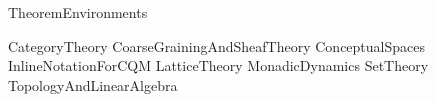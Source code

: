 


	{TheoremEnvironments} %
		
	\newcommand{\emptyArg}{\,\underline{\hspace{6px}}\,} %
	\newcommand{\inlineQuote}[1]{\textquotedblleft #1\textquotedblright} %
	\newcommand{\TODO}{\textbf{[TODO]}} %
	\newcommand{\citeTODO}[1]{\textbf{[#1]}} %


	\newcommand{\iffdef}{\stackrel{def}{\iff}} %
	\newcommand{\iffdeftemp}{\stackrel{\Delta}{\iff}} %
	\newcommand{\eqdef}{:=} %
	\newcommand{\eqdeftemp}{\stackrel{\Delta}{=}} %
	\newcommand{\imply}{\Rightarrow} %
	\newcommand{\turnstyle}{\models} %


	{CategoryTheory}
	{CoarseGrainingAndSheafTheory}
	{ConceptualSpaces}
	{InlineNotationForCQM}
	{LatticeTheory}
	{MonadicDynamics}
	{SetTheory}
	{TopologyAndLinearAlgebra}